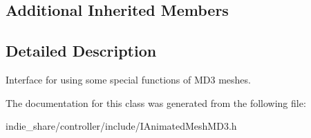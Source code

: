 \subsection*{Additional Inherited Members}


\subsection{Detailed Description}
Interface for using some special functions of M\+D3 meshes. 

The documentation for this class was generated from the following file\+:\begin{DoxyCompactItemize}
\item 
indie\+\_\+share/controller/include/I\+Animated\+Mesh\+M\+D3.\+h\end{DoxyCompactItemize}
